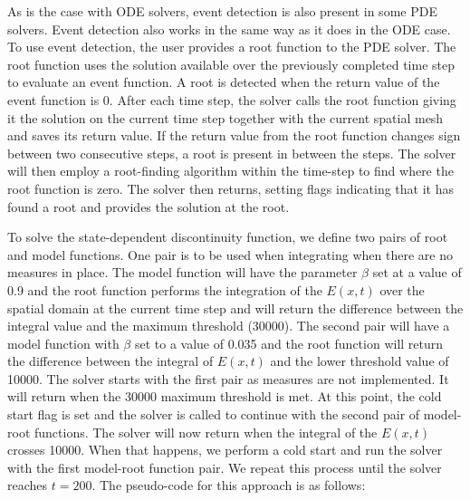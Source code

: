 \documentclass{article}
\begin{document}
As is the case with ODE solvers, event detection is also present in some PDE solvers. Event detection also works in the same way as it does in the ODE case. To use event detection, the user provides a root function to the PDE solver. The root function uses the solution available over the previously completed time step to evaluate an event function. A root is detected when the return value of the event function is 0. After each time step, the solver calls the root function giving it the solution on the current time step together with the current spatial mesh and saves its return value. If the return value from the root function changes sign between two consecutive steps, a root is present in between the steps. The solver will then employ a root-finding algorithm within the time-step to find where the root function is zero. The solver then returns, setting flags indicating that it has found a root and provides the solution at the root. 

To solve the state-dependent discontinuity function, we define two pairs of root and model functions. One pair is to be used when integrating when there are no measures in place. The model function will have the parameter $\beta$ set at a value of 0.9 and the root function performs the integration of the $E(x, t)$ over the spatial domain at the current time step and will return the difference between the integral value and the maximum threshold (30000). The second pair will have a model function with $\beta$ set to a value of 0.035 and the root function will return the difference between the integral of $E(x, t)$ and the lower threshold value of 10000. The solver starts with the first pair as measures are not implemented. It will return when the 30000 maximum threshold is met. At this point, the cold start flag is set and the solver is called to continue with the second pair of model-root functions. The solver will now return when the integral of the $E(x, t)$ crosses 10000. When that happens, we perform a cold start and run the solver with the first model-root function pair. We repeat this process until the solver reaches $t=200$. The pseudo-code for this approach is as follows:
\end{document}
